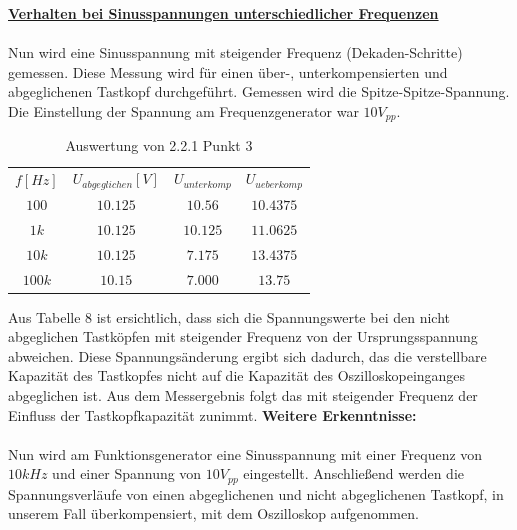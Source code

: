\documentclass[a4paper,12pt]{article}
\begin{document}
	\newpage
	\noindent
	\underline{\textbf{Verhalten bei Sinusspannungen unterschiedlicher Frequenzen}} \\ \\
	Nun wird eine Sinusspannung mit steigender Frequenz (Dekaden-Schritte) gemessen. Diese Messung wird für einen über-, unterkompensierten und abgeglichenen Tastkopf durchgeführt. Gemessen wird die Spitze-Spitze-Spannung. Die Einstellung der Spannung am Frequenzgenerator war $10V_{pp}$.
	\begin{table}[h]
		\centering
		\begin{tabular}{|c|c|c|c|}
			\hline
			\multirow{2}{*}{$f[Hz]$} & \multirow{2}{*}{$U_{abgeglichen}[V]$} & \multirow{2}{*}{$U_{unterkomp}$} & \multirow{2}{*}{$U_{ueberkomp}$} \\
			&  &  &  \\ \hline
			\multirow{2}{*}{$100$} & \multirow{2}{*}{$10.125$} & \multirow{2}{*}{$10.56$} & \multirow{2}{*}{$10.4375$} \\
			&  &  &  \\ \hline
			\multirow{2}{*}{$1k$} & \multirow{2}{*}{$10.125$} & \multirow{2}{*}{$10.125$} & \multirow{2}{*}{$11.0625$} \\
			&  &  &  \\ \hline
			\multirow{2}{*}{$10k$} & \multirow{2}{*}{$10.125$} & \multirow{2}{*}{$7.175$} & \multirow{2}{*}{$13.4375$} \\
			&  &  &  \\ \hline
			\multirow{2}{*}{$100k$} & \multirow{2}{*}{$10.15$} & \multirow{2}{*}{$7.000$} & \multirow{2}{*}{$13.75$} \\
			&  &  &  \\ \hline
		\end{tabular}
		\caption{Auswertung von 2.2.1 Punkt 3}
	\end{table}
	\newline
	Aus Tabelle 8 ist ersichtlich, dass sich die Spannungswerte bei den nicht abgeglichen Tastköpfen mit steigender Frequenz von der Ursprungsspannung abweichen. Diese Spannungsänderung ergibt sich dadurch, das die verstellbare Kapazität des Tastkopfes nicht auf die Kapazität des Oszilloskopeinganges abgeglichen ist. Aus dem Messergebnis folgt das mit steigender Frequenz der Einfluss der Tastkopfkapazität zunimmt.
	\newpage
	\noindent
	\textbf{Weitere Erkenntnisse:} \\ \\
	Nun wird am Funktionsgenerator eine Sinusspannung mit einer Frequenz von $10kHz$ und einer Spannung von $10V_{pp}$ eingestellt. Anschließend werden die Spannungsverläufe von einen abgeglichenen und nicht abgeglichenen Tastkopf, in unserem Fall überkompensiert, mit dem Oszilloskop aufgenommen. 
\end{document}
